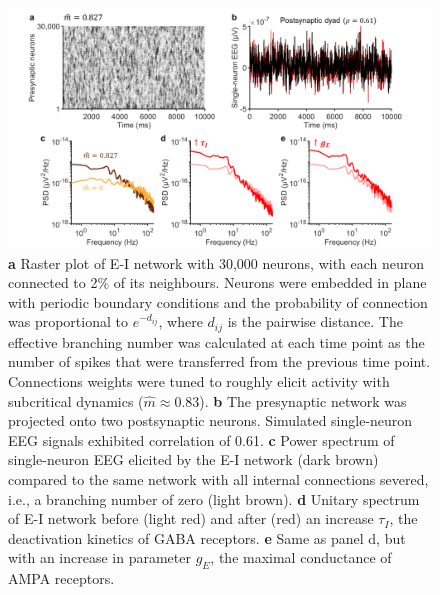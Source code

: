 \begin{figure}[t]
\centering
\includegraphics[width=14cm]{Figures/Discussion/subcritical_network.png}
\vspace{-1em}
\caption[E-I network near criticality generates dipole synchrony]{
\textbf{a} Raster plot of E-I network with 30,000 neurons, with each neuron connected to 2\% of its neighbours. Neurons were embedded in plane with periodic boundary conditions and the probability of connection was proportional to $e^{-d_{ij}}$, where $d_{ij}$ is the pairwise distance. The effective branching number was calculated at each time point as the number of spikes that were transferred from the previous time point. Connections weights were tuned to roughly elicit activity with subcritical dynamics ($\hat{m}\approx0.83$).
\textbf{b} The presynaptic network was projected onto two postsynaptic neurons. Simulated single-neuron EEG signals exhibited correlation of 0.61. 
\textbf{c} Power spectrum of single-neuron EEG elicited by the E-I network (dark brown) compared to the same network with all internal connections severed, i.e., a branching number of zero (light brown).
\textbf{d} Unitary spectrum of E-I network before (light red) and after (red) an increase $\tau_I$, the deactivation kinetics of GABA receptors. 
\textbf{e} Same as panel d, but with an increase in parameter $g_E$, the maximal conductance of AMPA receptors.}
\label{fig:EI_crit}
\vspace{-1em}
\end{figure}

